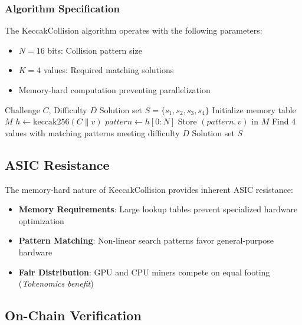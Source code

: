 \documentclass[11pt,a4paper]{article}
\begin{document}
\subsubsection{Algorithm Specification}

The KeccakCollision algorithm operates with the following parameters:

\begin{itemize}
    \item $N = 16$ bits: Collision pattern size
    \item $K = 4$ values: Required matching solutions
    \item Memory-hard computation preventing parallelization
\end{itemize}

\begin{algorithm}
\caption{KeccakCollision Mining}
\begin{algorithmic}[1]
\Require Challenge $C$, Difficulty $D$
\Ensure Solution set $S = \{s_1, s_2, s_3, s_4\}$
\State Initialize memory table $M$
    \State $h \gets \text{keccak256}(C \| v)$
    \State $pattern \gets h[0:N]$ 
    \State Store $(pattern, v)$ in $M$
\EndFor
\State Find 4 values with matching patterns meeting difficulty $D$
\State \Return Solution set $S$
\end{algorithmic}
\end{algorithm}

\subsection{ASIC Resistance}

The memory-hard nature of KeccakCollision provides inherent ASIC resistance:

\begin{itemize}
    \item \textbf{Memory Requirements}: Large lookup tables prevent specialized hardware optimization
    \item \textbf{Pattern Matching}: Non-linear search patterns favor general-purpose hardware
    \item \textbf{Fair Distribution}: GPU and CPU miners compete on equal footing (\textit{Tokenomics benefit})
\end{itemize}

\subsection{On-Chain Verification}
\end{document}
